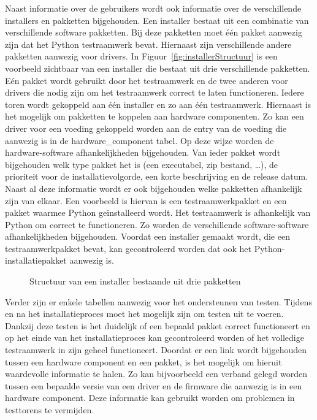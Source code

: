 Naast informatie over de gebruikers wordt ook informatie over de verschillende installers en pakketten bijgehouden.
Een installer bestaat uit een combinatie van verschillende software pakketten.
Bij deze pakketten moet één pakket aanwezig zijn dat het Python testraamwerk bevat.
Hiernaast zijn verschillende andere pakketten aanwezig voor drivers.
In Figuur~\vref{fig:installerStructuur} is een voorbeeld zichtbaar van een installer die bestaat uit drie verschillende pakketten.
Eén pakket wordt gebruikt door het testraamwerk en de twee anderen voor drivers die nodig zijn om het testraamwerk correct te laten functioneren.
Iedere toren wordt gekoppeld aan één installer en zo aan één testraamwerk.
Hiernaast is het mogelijk om pakketten te koppelen aan hardware componenten.
Zo kan een driver voor een voeding gekoppeld worden aan de entry van de voeding die aanwezig is in de hardware\_component tabel.
Op deze wijze worden de hardware-software afhankelijkheden bijgehouden.
Van ieder pakket wordt bijgehouden welk type pakket het is (een executabel, zip bestand, \ldots), de prioriteit voor de installatievolgorde, een korte beschrijving en de release datum.
Naast al deze informatie wordt er ook bijgehouden welke pakketten afhankelijk zijn van elkaar.
Een voorbeeld is hiervan is een testraamwerkpakket en een pakket waarmee Python geïnstalleerd wordt.
Het testraamwerk is afhankelijk van Python om correct te functioneren.
Zo worden de verschillende software-software afhankelijkheden bijgehouden.
Voordat een installer gemaakt wordt, die een testraamwerkpakket bevat, kan gecontroleerd worden dat ook het Python-installatiepakket aanwezig is.

\begin{figure}[!ht]
\centering
{}
\caption{Structuur van een installer bestaande uit drie pakketten}
\label{fig:installerStructuur}
\end{figure}

Verder zijn er enkele tabellen aanwezig voor het ondersteunen van testen.
Tijdens en na het installatieproces moet het mogelijk zijn om testen uit te voeren.
Dankzij deze testen is het duidelijk of een bepaald pakket correct functioneert en op het einde van het installatieproces kan gecontroleerd worden of het volledige testraamwerk in zijn geheel functioneert.
Doordat er een link wordt bijgehouden tussen een hardware component en een pakket, is het mogelijk om hieruit waardevolle informatie te halen.
Zo kan bijvoorbeeld een verband gelegd worden tussen een bepaalde versie van een driver en de firmware die aanwezig is in een hardware component.
Deze informatie kan gebruikt worden om problemen in testtorens te vermijden.

